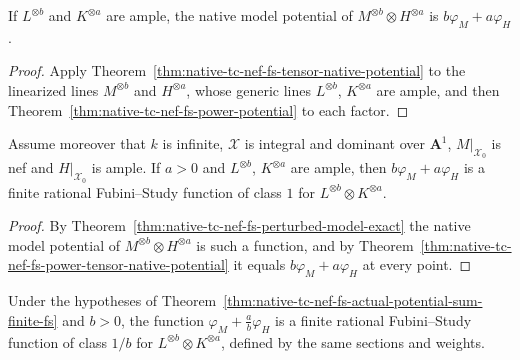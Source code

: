 \begin{theorem}
\label{thm:native-tc-nef-fs-power-tensor-native-potential}
\leanok
{}
If $L^{\otimes b}$ and $K^{\otimes a}$ are ample, the native model potential of
$M^{\otimes b}\otimes H^{\otimes a}$ is $b\varphi_M+a\varphi_H$.
\end{theorem}

\begin{proof}
Apply Theorem~\ref{thm:native-tc-nef-fs-tensor-native-potential} to the linearized lines
$M^{\otimes b}$ and $H^{\otimes a}$, whose generic lines $L^{\otimes b}$, $K^{\otimes a}$
are ample, and then Theorem~\ref{thm:native-tc-nef-fs-power-potential} to each factor.
\end{proof}

\begin{theorem}
\label{thm:native-tc-nef-fs-actual-potential-sum-finite-fs}
\leanok
{}
Assume moreover that $k$ is infinite, $\mathcal X$ is integral and dominant over
$\mathbf A^1$, $M|_{\mathcal X_0}$ is nef and $H|_{\mathcal X_0}$ is ample.  If $a>0$ and
$L^{\otimes b}$, $K^{\otimes a}$ are ample, then $b\varphi_M+a\varphi_H$ is a finite
rational Fubini--Study function of class $1$ for $L^{\otimes b}\otimes K^{\otimes a}$.
\end{theorem}

\begin{proof}
By Theorem~\ref{thm:native-tc-nef-fs-perturbed-model-exact} the native model potential of
$M^{\otimes b}\otimes H^{\otimes a}$ is such a function, and by
Theorem~\ref{thm:native-tc-nef-fs-power-tensor-native-potential} it equals
$b\varphi_M+a\varphi_H$ at every point.
\end{proof}

\begin{corollary}
\label{cor:native-tc-nef-fs-potential-add-div}
\leanok
{}
Under the hypotheses of Theorem~\ref{thm:native-tc-nef-fs-actual-potential-sum-finite-fs}
and $b>0$, the function $\varphi_M+\frac ab\varphi_H$ is a finite rational Fubini--Study
function of class $1/b$ for $L^{\otimes b}\otimes K^{\otimes a}$, defined by the same
sections and weights.
\end{corollary}

